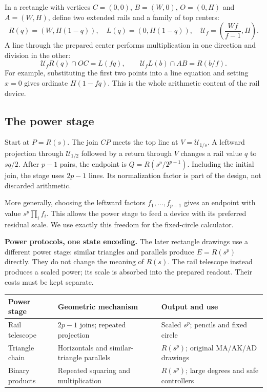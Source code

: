 \documentclass[11pt,a4paper]{article}
\newcommand{\hub}[1]{\mathcal U_{#1}}
\begin{document}
In a rectangle with vertices $C=(0,0)$, $B=(W,0)$, $O=(0,H)$ and $A=(W,H)$, define two extended rails and a family of top centers:
\begin{equation}\label{eq:rails}
 R(q)=(W,H(1-q)),\quad L(q)=(0,H(1-q)),\quad
 \hub{f}=\left(\frac{Wf}{f-1},H\right).
\end{equation}
A line through the prepared center performs multiplication in one direction and division in the other:
\begin{equation}\label{eq:railops}
 \hub{f}R(q)\cap OC=L(fq),\qquad
 \hub{f}L(b)\cap AB=R(b/f).
\end{equation}
For example, substituting the first two points into a line equation and setting $x=0$ gives ordinate $H(1-fq)$. This is the whole arithmetic content of the rail device.

\subsection{The power stage}
Start at $P=R(s)$. The join $CP$ meets the top line at $V=\hub{1/s}$. A leftward projection through $\hub{1/2}$ followed by a return through $V$ changes a rail value $q$ to $sq/2$. After $p-1$ pairs, the endpoint is $Q=R(s^p/2^{p-1})$. Including the initial join, the stage uses $2p-1$ lines. Its normalization factor is part of the design, not discarded arithmetic.

More generally, choosing the leftward factors $f_1,\ldots,f_{p-1}$ gives an endpoint with value $s^p\prod_i f_i$. This allows the power stage to feed a device with its preferred residual scale. We use exactly this freedom for the fixed-circle calculator.


\textbf{Power protocols, one state encoding.} The later rectangle drawings use a different power stage: similar triangles and parallels produce $E=R(s^p)$ directly. They do not change the meaning of $R(s)$. The rail telescope instead produces a scaled power; its scale is absorbed into the prepared readout. Their costs must be kept separate.
\begin{center}\small
\begin{tabularx}{\linewidth}{@{}lXX@{}}\toprule
Power stage & Geometric mechanism & Output and use\\\midrule
Rail telescope & $2p-1$ joins; repeated projection & Scaled $s^p$; pencils and fixed circle\\
Triangle chain & Horizontals and similar-triangle parallels & $R(s^p)$; original MA/AK/AD drawings\\
Binary products & Repeated squaring and multiplication & $R(s^p)$; large degrees and safe controllers\\\bottomrule
\end{tabularx}\end{center}
\end{document}
